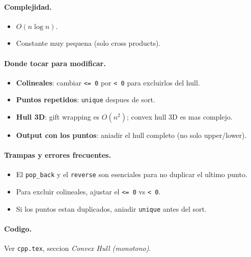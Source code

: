 \paragraph{Complejidad.}
\begin{itemize}\setlength\itemsep{0pt}
	\item $O(n \log n)$.
	\item Constante muy pequena (solo cross products).
\end{itemize}

\paragraph{Donde tocar para modificar.}
\begin{itemize}\setlength\itemsep{0pt}
	\item \textbf{Colineales}: cambiar \texttt{<= 0} por \texttt{< 0} para excluirlos del hull.
	\item \textbf{Puntos repetidos}: \texttt{unique} despues de sort.
	\item \textbf{Hull 3D}: gift wrapping es $O(n^2)$; convex hull 3D es mas complejo.
	\item \textbf{Output con los puntos}: aniadir el hull completo (no solo upper/lower).
\end{itemize}

\paragraph{Trampas y errores frecuentes.}
\begin{itemize}\setlength\itemsep{0pt}
	\item El \texttt{pop\_back} y el \texttt{reverse} son esenciales para no duplicar el ultimo punto.
	\item Para excluir colineales, ajustar el \texttt{<= 0} vs \texttt{< 0}.
	\item Si los puntos estan duplicados, aniadir \texttt{unique} antes del sort.
\end{itemize}

\paragraph{Codigo.}
Ver \texttt{cpp.tex}, seccion \textit{Convex Hull (monotono)}.

\vspace{0.5em}
